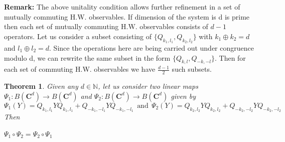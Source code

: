 \documentclass[12pt]{amsart}
\numberwithin{equation}{section}
\newtheorem{theorem}{Theorem}[section]
\newtheorem{lemma}{Lemma}[section]
\begin{document}
\textbf{Remark:} The above unitality condition allows further refinement in a set of mutually commuting H.W. observables. If dimension of the system is d is prime then each set of mutually commuting H.W. observables consists of $d-1$ operators. Let us consider a subset consisting of $\lbrace Q_{k_1,l_1}, Q_{k_2,l_2}\rbrace$ with $k_1 \oplus k_2=d$ and $l_1 \oplus l_2 =d$. Since the operations here are being carried out under congruence modulo d, we can rewrite the same subset in the form $\lbrace Q_{k,l}, Q_{-k,-l}\rbrace$. 
Then for each set of commuting H.W. observables we have $\frac{d-1}{2}$ such subsets.\\

\begin{theorem}\label{theorem1}
    Given any $d \in \mathbb{N} $,  let us consider two linear maps $\Psi_1: B\left(\mathbf{C}^d\right) \rightarrow B\left(\mathbf{C}^d\right) $ and $\Psi_2:B\left(\mathbf{C}^d\right) \rightarrow B\left(\mathbf{C}^d\right)$ given by
        \[\Psi_1 (Y)=Q_{k_1,l_1} Y Q_{k_1,l_1} + Q_{-k_1,-l_1} Y Q_{-k_1,-l_1} ~~\text{and}~~\Psi_2 (Y)=Q_{k_2,l_2} Y Q_{k_2,l_2} + Q_{-k_2,-l_2} Y Q_{-k_2,-l_2}\]
    Then
    \begin{center}
        $\Psi_1 \circ \Psi_2 = \Psi_2 \circ \Psi_1$
    \end{center}
\end{theorem}

\vspace{0.3cm}
\end{document}
